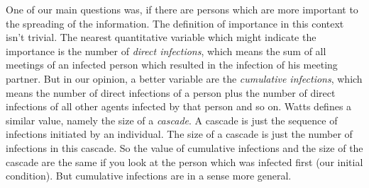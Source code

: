 One of our main questions was, if there are persons which are more important to the spreading of the information. The definition of importance in this context isn't trivial. The nearest quantitative variable which might indicate the importance is the number of \textit{direct infections}, which means the sum of all meetings of an infected person which resulted in the infection of his meeting partner. But in our opinion, a better variable are the \textit{cumulative infections}, which means the number of direct infections of a person plus the number of direct infections of all other agents infected by that person and so on. Watts \cite{influentials} defines a similar value, namely the size of a \textit{cascade}. A cascade is just the sequence of infections initiated by an individual. The size of a cascade is just the number of infections in this cascade. So the value of cumulative infections and the size of the cascade are the same if you look at the person which was infected first (our initial condition). But cumulative infections are in a sense more general. 




